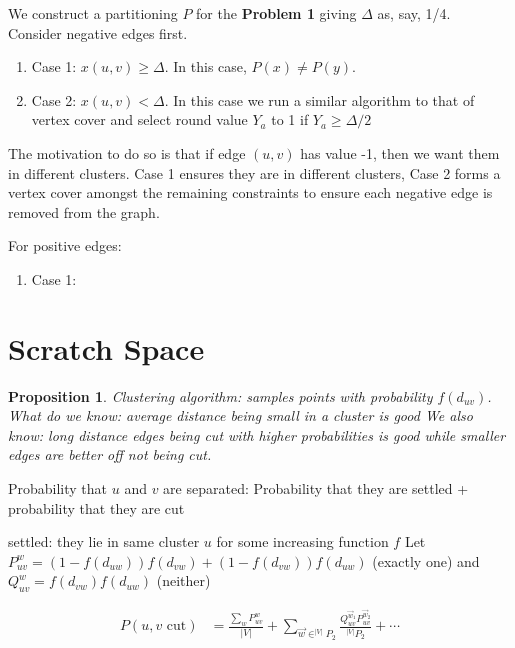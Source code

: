 \documentclass{article}
\newtheorem{proposition}[theorem]{Proposition}
\begin{document}
We construct a partitioning $P$ for the \textbf{Problem 1} giving $\Delta$ as, say, 1/4.\\
Consider negative edges first.
\begin{enumerate}
    \item Case 1: $x(u,v)\geq \Delta$. In this case, $P(x)\neq P(y)$.
    \item Case 2: $x(u,v) < \Delta$. In this case we run a similar algorithm to that of vertex cover and select round value $Y_a$ to 1 if $Y_a \geq \Delta /2$
\end{enumerate}
The motivation to do so is that if edge $(u,v)$ has value -1, then we want them in different clusters. Case 1 ensures they are in different clusters, Case 2 forms a vertex cover amongst the remaining constraints to ensure each negative edge is removed from the graph.

For positive edges:
\begin{enumerate}
    \item Case 1: 
\end{enumerate}

\section{Scratch Space}

\begin{proposition}
Clustering algorithm: samples points with probability $f(d_{uv})$.
What do we know: average distance being small in a cluster is good
We also know: long distance edges being cut with higher probabilities is good while smaller edges are better off not being cut.
\end{proposition}
Probability that $u$ and $v$ are separated:
Probability that they are settled + probability that they are cut

settled: they lie in same cluster $u$ for some increasing function $f$
Let $P_{uv}^w = (1-f(d_{uw})) f(d_{vw}) + (1-f(d_{vw})) f(d_{uw})$ (exactly one) and $Q_{uv}^w = f(d_{vw}) f(d_{uw})$ (neither)

\begin{align}
P (u,v \text{ cut}) &= \frac{\sum_w P_{uv}^w}{|V|} + \sum_{\vec{w} \in ^{|V|}P_{2}} \frac{Q_{uv}^{\vec{w}_1} P_{uv}^{\vec{w}_2} }{^{|V|}P_{2}} +\cdots
\label{eq:q123}
\end{align}
\end{document}
